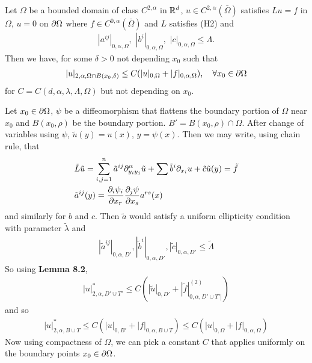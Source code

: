 \documentclass[12pt,a4paper]{article}
\newenvironment{proof}
{\begin{changemargin}{0.5cm}{0.5cm} 
	}%
	{\end{changemargin}
}
\newenvironment{p}
{\begin{proof} 
	}%
	{\end{proof}
}
\begin{document}
 Let $\Omega$ be a bounded domain of class $C^{2, \alpha}$ in $\mathbb{R}^d$, $u\in C^{2, \alpha}(\bar{\Omega})$ satisfies $Lu = f$ in $\Omega$, $u =0$ on $\partial \Omega$ where $f\in C^{0, \alpha}(\bar{\Omega})$ and $L$ satisfies (H2) and
\begin{align*}
|a^{ij}|_{0, \alpha, \Omega}, \,\, |b^{i}|_{0, \alpha, \Omega},\,\, |c|_{0, \alpha, \Omega} \leq \Lambda.
\end{align*}
Then we have, for some $\delta>0$ not depending $x_0$ such that
\begin{align*}
|u|_{2, \alpha, \Omega \cap B(x_0, \delta)} \leq C(|u|_{0, \Omega} + |f|_{0, \alpha, \Omega}), \quad \forall x_0 \in \partial \Omega
\end{align*} 
for $C = C(d, \alpha, \lambda, \Lambda, \Omega)$ but not depending on $x_0$.
\begin{p}
\pf Let $x_0 \in \partial \Omega$, $\psi$ be a diffeomorphism that flattens the boundary portion of $\Omega$ near $x_0$ and $B(x_0, \rho)$ be the boundary portion. $B' = B(x_0, \rho) \cap \Omega$. After change of variables using $\psi$, $\tilde{u}(y) = u(x)$, $y = \psi(x)$. Then we may write, using chain rule, that 
\begin{align*}
&\tilde{L}\tilde{u}= \sum_{i,j=1}^n \tilde{a}^{ij} \partial_{y_i y_j}^{\alpha} \tilde{u} + \sum \tilde{b}^i \partial_{x_i} u + \tilde{c}\tilde{u}(y) = \tilde{f} \\
&\tilde{a}^{ij}(y) = \frac{\partial_i \psi_i}{\partial x_r} \frac{\partial_j \psi}{\partial x_s} a^{rs}(x)
\end{align*}
and similarly for $b$ and $c$. Then $\tilde{a}$ would satisfy a uniform ellipticity condition with parameter $\tilde{\lambda}$ and
\begin{align*}
|\tilde{a}^{ij}|_{0, \alpha, D'}, |\tilde{b}^i|_{0, \alpha, D'}, |\tilde{c}|_{0, \alpha, D'}\leq \tilde{\Lambda} 
\end{align*}
So using \textbf{Lemma 8.2},
\begin{align*}
|u|^*_{2, \alpha, D' \cup T'} \leq C(|\tilde{u}|_{0, D'} + |\tilde{f}|^{(2)}_{0, \alpha, D' \cup T']})
\end{align*}
and so
\begin{align*}
|u|^*_{2,\alpha, B\cup T} \leq  C(|u|_{0, B'} + |f|_{0, \alpha, B\cup T}) \leq C(|u|_{0, \Omega}+ |f|_{0, \alpha, \Omega})
\end{align*}
Now using compactness of $\Omega$, we can pick a constant $C$ that applies uniformly on the boundary points $x_0 \in \partial \Omega$.
\s

\eop
\end{p}
\end{document}
